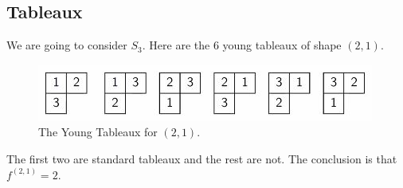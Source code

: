 \documentclass{article}
\begin{document}
\subsection{Tableaux}
We are going to consider $S_3$. Here are the 6 young tableaux of shape $(2, 1)$.
\begin{figure}[!ht]
  \centering
  \includegraphics{./figures/L1.1}
  \caption{The Young Tableaux for $(2, 1)$.}
  \label{}
\end{figure}
The first two are standard tableaux and the rest are not. The conclusion is that $f^{(2, 1)} = 2$.
\end{document}
